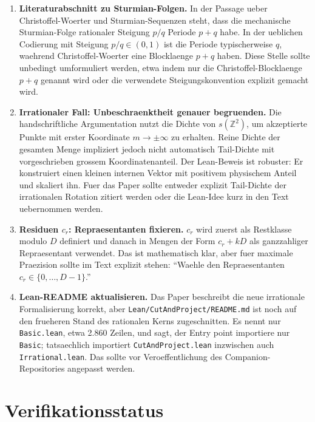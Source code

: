 \documentclass[11pt]{article}
\begin{document}
\begin{enumerate}
    \item \textbf{Literaturabschnitt zu Sturmian-Folgen.}
    In der Passage ueber Christoffel-Woerter und Sturmian-Sequenzen steht,
    dass die mechanische Sturmian-Folge rationaler Steigung \(p/q\) Periode
    \(p+q\) habe. In der ueblichen Codierung mit Steigung
    \(p/q \in (0,1)\) ist die Periode typischerweise \(q\), waehrend
    Christoffel-Woerter eine Blocklaenge \(p+q\) haben. Diese Stelle sollte
    unbedingt umformuliert werden, etwa indem nur die Christoffel-Blocklaenge
    \(p+q\) genannt wird oder die verwendete Steigungskonvention explizit
    gemacht wird.

    \item \textbf{Irrationaler Fall: Unbeschraenktheit genauer begruenden.}
    Die handschriftliche Argumentation nutzt die Dichte von
    \(s(\mathbb Z^2)\), um akzeptierte Punkte mit erster Koordinate
    \(m\to\pm\infty\) zu erhalten. Reine Dichte der gesamten Menge impliziert
    jedoch nicht automatisch Tail-Dichte mit vorgeschrieben grossem
    Koordinatenanteil. Der Lean-Beweis ist robuster: Er konstruiert einen
    kleinen internen Vektor mit positivem physischem Anteil und skaliert ihn.
    Fuer das Paper sollte entweder explizit Tail-Dichte der irrationalen
    Rotation zitiert werden oder die Lean-Idee kurz in den Text uebernommen
    werden.

    \item \textbf{Residuen \(c_r\): Repraesentanten fixieren.}
    \(c_r\) wird zuerst als Restklasse modulo \(D\) definiert und danach in
    Mengen der Form \(c_r+kD\) als ganzzahliger Repraesentant verwendet. Das
    ist mathematisch klar, aber fuer maximale Praezision sollte im Text
    explizit stehen: ``Waehle den Repraesentanten
    \(c_r\in\{0,\ldots,D-1\}\).''

    \item \textbf{Lean-README aktualisieren.}
    Das Paper beschreibt die neue irrationale Formalisierung korrekt, aber
    \texttt{Lean/CutAndProject/README.md} ist noch auf den frueheren Stand
    des rationalen Kerns zugeschnitten. Es nennt nur \texttt{Basic.lean},
    etwa 2.860 Zeilen, und sagt, der Entry point importiere nur
    \texttt{Basic}; tatsaechlich importiert
    \texttt{CutAndProject.lean} inzwischen auch \texttt{Irrational.lean}.
    Das sollte vor Veroeffentlichung des Companion-Repositories angepasst
    werden.
\end{enumerate}

\section*{Verifikationsstatus}
\end{document}
